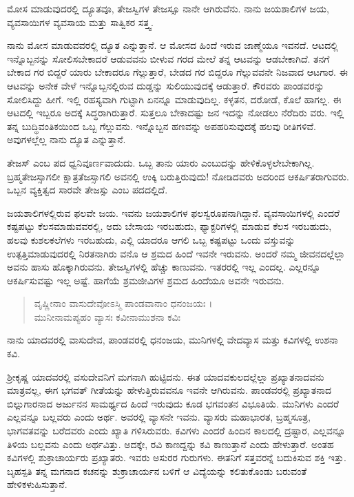 {\small ಮೋಸ ಮಾಡುವುದರಲ್ಲಿ ದ್ಯೂತವೂ, ತೇಜಸ್ವಿಗಳ ತೇಜಸ್ಸೂ ನಾನೇ ಆಗಿರುವೆನು. ನಾನು ಜಯಶಾಲಿಗಳ ಜಯ, ವ್ಯವಸಾಯಿಗಳ ವ್ಯವಸಾಯ ಮತ್ತು ಸಾತ್ವಿಕರ ಸತ್ತ್ವ.}

ನಾನು ಮೋಸ ಮಾಡುವವರಲ್ಲಿ ದ್ಯೂತ ಎನ್ನುತ್ತಾನೆ. ಆ ಮೋಸದ ಹಿಂದೆ ಇರುವ ಜಾಣ್ಮೆಯೂ ಇವನದೆ. ಆಟದಲ್ಲಿ ಇನ್ನೊಬ್ಬನನ್ನು ಸೋಲಿಸಬೇಕಾದರೆ ಆಡುವವನು ಬೀಳುವ ಗರದ ಮೇಲೆ ತನ್ನ ಆಟವನ್ನು ಆಡಬೇಕಾಗಿದೆ. ತನಗೆ ಬೇಕಾದ ಗರ ಬಿದ್ದರೆ ಯಾರು ಬೇಕಾದರೂ ಗೆಲ್ಲುತ್ತಾರೆ, ಬೇಡದ ಗರ ಬಿದ್ದರೂ ಗೆಲ್ಲುವವನೇ ನಿಜವಾದ ಆಟಗಾರ. ಈ ಆಟವನ್ನು ಅನೇಕ ವೇಳೆ ಇನ್ನೊಬ್ಬನಲ್ಲಿರುವ ದುಡ್ಡನ್ನು ಸುಲಿಯುವುದಕ್ಕೆ ಆಡುತ್ತಾರೆ. ಕೌರವರು ಪಾಂಡವರನ್ನು ಸೋಲಿಸಿದ್ದು ಹೀಗೆ. ಇಲ್ಲಿ ರಹಸ್ಯವಾಗಿ ಗುಟ್ಟಾಗಿ ಏನನ್ನೂ ಮಾಡುವುದಿಲ್ಲ. ಕಳ್ಳತನ, ದರೋಡೆ, ಕೊಲೆ ಹಾಗಲ್ಲ. ಈ ಆಟದಲ್ಲಿ ಇಬ್ಬರೂ ಅದಕ್ಕೆ ಸಿದ್ಧರಾಗಿರುತ್ತಾರೆ. ಸುತ್ತಲೂ ಬೇಕಾದಷ್ಟು ಜನ ಇದನ್ನು ನೋಡಲು ನೆರೆದಿರು ವರು. ಇಲ್ಲಿ ತನ್ನ ಬುದ್ಧಿವಂತಿಕಯಿಂದ ಒಬ್ಬ ಗೆಲ್ಲುವನು. ಇನ್ನೊಬ್ಬನ ಹಣವನ್ನು ಅಪಹರಿಸುವುದಕ್ಕೆ ಹಲವು ರೀತಿಗಳಿವೆ. ಅವುಗಳಲ್ಲೆಲ್ಲ ನಾನು ದ್ಯೂತ ಎನ್ನುತ್ತಾನೆ. 

ತೇಜಸ್ ಎಂಬ ಪದ ಧ್ವನಿವೂರ್ಣವಾದುದು. ಒಬ್ಬ ತಾನು ಯಾರು ಎಂಬುದನ್ನು ಹೇಳಿಕೊಳ್ಳಲೇಬೇಕಾಗಿಲ್ಲ. ಬ್ರಹ್ಮತೇಜಸ್ಸಾಗಲೀ ಕ್ಷಾತ್ರತೆಜಸ್ಸಾಗಲಿ ಅವನಲ್ಲಿ ಉಕ್ಕಿ ಬರುತ್ತಿರುವುದು! ನೋಡಿದವರು ಅದರಿಂದ ಆಕರ್ಷಿತರಾಗುವರು. ಒಬ್ಬನ ವ್ಯಕ್ತಿತ್ವದ ಸಾರವೇ ತೇಜಸ್ಸು ಎಂಬ ಪದದಲ್ಲಿದೆ. 

ಜಯಶಾಲಿಗಳಲ್ಲಿರುವ ಫಲವೇ ಜಯ. ಇವನು ಜಯಶಾಲಿಗಳ ಫಲಸ್ವರೂಪನಾಗಿದ್ದಾನೆ. ವ್ಯವಸಾಯಿಗಳಲ್ಲಿ ಎಂದರೆ ಕಷ್ಟಪಟ್ಟು ಕೆಲಸಮಾಡುವವರಲ್ಲಿ, ಅದು ಬೇಸಾಯ ಇರಬಹುದು, ಫ್ಯಾಕ್ಟರಿಗಳಲ್ಲಿ ಮಾಡುವ ಕೆಲಸ ಇರಬಹುದು, ಹಲವು ಕುಶಲಕಲೆಗಳು ಇರಬಹುದು, ಎಲ್ಲಿ ಯಾದರೂ ಆಗಲಿ ಒಬ್ಬ ಕಷ್ಟಪಟ್ಟು ಒಂದು ವಸ್ತುವನ್ನು ಉತ್ಪತ್ತಿಮಾಡುವುದರಲ್ಲಿ ನಿರತನಾಗಿರು ವನೊ ಆ ಶ್ರಮದ ಹಿಂದೆ ಇವನೇ ಇರುವನು. ಅಂದರೆ ನಮ್ಮ ಜೀವನದಲ್ಲೆಲ್ಲಾ ಅವನು ಹಾಸು ಹೊಕ್ಕಾಗಿರುವನು. ತೇಜಸ್ವಿಗಳಲ್ಲಿ ಹೆಚ್ಚು ಕಾಣುವನು. ಇತರರಲ್ಲಿ ಇಲ್ಲ ಎಂದಲ್ಲ. ಎಲ್ಲರನ್ನೂ ಆಕರ್ಷಿಸುವಷ್ಟು ಇಲ್ಲ ಅಷ್ಟೆ. ಹಾಗೆಯೆ ಶ್ರಮಜೀವಿಗಳ ಶ್ರಮದ ಹಿಂದೆಯೂ ಅವನೇ ಇರುವನು.

\begin{verse}
ವೃಷ್ಣೀನಾಂ ವಾಸುದೇವೋಽಸ್ಮಿ ಪಾಂಡವಾನಾಂ ಧನಂಜಯಃ ।\\ಮುನೀನಾಮಪ್ಯಹಂ ವ್ಯಾಸಃ ಕವೀನಾಮುಶನಾ ಕವಿಃ 
\end{verse}

{\small ನಾನು ಯಾದವರಲ್ಲಿ ವಾಸುದೇವ, ಪಾಂಡವರಲ್ಲಿ ಧನಂಜಯ, ಮುನಿಗಳಲ್ಲಿ ವೇದವ್ಯಾಸ ಮತ್ತು ಕವಿಗಳಲ್ಲಿ ಉಶನಾ ಕವಿ.}

ಶ್ರೀಕೃಷ್ಣ ಯಾದವರಲ್ಲಿ ವಸುದೇವನಿಗೆ ಮಗನಾಗಿ ಹುಟ್ಟಿದನು. ಈತ ಯಾದವಕುಲದಲ್ಲೆಲ್ಲಾ ಪ್ರಖ್ಯಾತನಾದವನು ಮಾತ್ರವಲ್ಲ, ಈಗ ಭಗವತ್ ಗೀತೆಯನ್ನು ಹೇಳುತ್ತಿರುವವನೂ ಇವನೇ ಆಗಿರುವನು. ಪಾಂಡವರಲ್ಲಿ ಪ್ರಖ್ಯಾತನಾದ ಬಿಲ್ಲುಗಾರನಾದ ಅರ್ಜುನನ ಸಾಮರ್ಥ್ಯದ ಹಿಂದೆ ಇರುವುದು ಕೂಡ ಭಗವಂತನ ವಿಭೂತಿಯೆ. ಮುನಿಗಳು ಎಂದರೆ ಎಲ್ಲವನ್ನೂ ಬಲ್ಲವರು ಎಂದು ಅರ್ಥ. ಅವರಲ್ಲಿ ವ್ಯಾಸನೇ ಇವನು. ವ್ಯಾಸರು ಮಹಾಭಾರತ, ಬ್ರಹ್ಮಸೂತ್ರ, ಭಾಗವತವನ್ನು ಬರೆದವರು ಎಂದು ಖ್ಯಾತಿ ಗಳಿಸಿರುವರು. ಕವಿಗಳು ಎಂದರೆ ಹಿಂದಿನ ಕಾಲದಲ್ಲಿ ದ್ರಷ್ಟಾರ, ಎಲ್ಲವನ್ನೂ ತಿಳಿಯ ಬಲ್ಲವನು ಎಂದು ಅರ್ಥವಿತ್ತು. ಅದಕ್ಕೇ, ರವಿ ಕಾಣದ್ದನ್ನು ಕವಿ ಕಾಣುತ್ತಾನೆ ಎಂದು ಹೇಳುತ್ತಾರೆ. ಅಂತಹ ಕವಿಗಳಲ್ಲಿ ಶುಕ್ರಾಚಾರ್ಯರು ಪ್ರಖ್ಯಾತರು. ಇವರು ಅಸುರರ ಗುರುಗಳು. ಈತನಿಗೆ ಸತ್ತವರನ್ನೆ ಬದುಕಿಸುವ ಶಕ್ತಿ ಇತ್ತು. ಬೃಹಸ್ಪತಿ ತನ್ನ ಮಗನಾದ ಕಚನನ್ನು ಶುಕ್ರಾಚಾರ್ಯನ ಬಳಿಗೆ ಆ ವಿದ್ಯೆಯನ್ನು ಕಲಿತುಕೊಂಡು ಬರುವಂತೆ ಹೇಳಿಕಳುಹಿಸುತ್ತಾನೆ.

